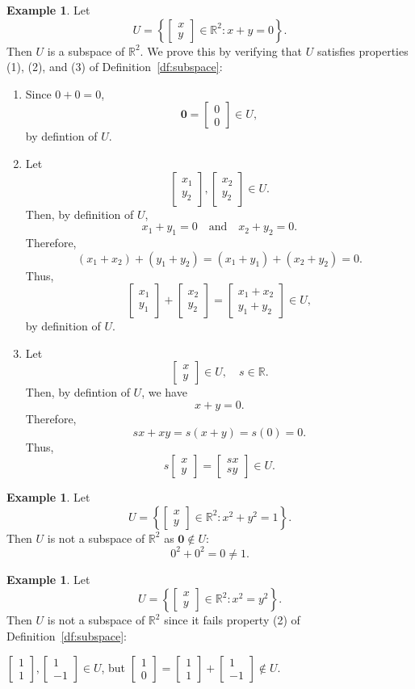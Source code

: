 \documentclass[12pt]{amsart}
\newcommand{\RR}{\mathbb{R}}
\theoremstyle{definition} \newtheorem{definition}[theorem]{Definition}
\newtheorem{example}[theorem]{Example}
\newcommand{\bzero}{\mathbf{0}}
\newcommand{\mat}[1]{\begin{bmatrix}#1\end{bmatrix}}
\begin{document}
\begin{example}\label{eg:nullspace_in_disguise}
  Let
  \[
    U = \left\{\mat{x\\y}\in\RR^2 : x+y=0\right\}.
  \]
  Then $U$ is a subspace of $\RR^2$. We prove this by verifying that $U$ satisfies properties (1), (2), and (3) of Definition~\ref{df:subspace}:
  \begin{enumerate}
    \item Since $0+0=0$,
    \[
      \bzero=\mat{0\\0}\in U,
    \]
    by defintion of $U$.

  \item Let
    \[
      \mat{x_1\\y_2},\mat{x_2\\y_2}\in U.
    \]
    Then, by definition of $U$,
    \[
      x_1+y_1=0\quad\text{and}\quad x_2+y_2=0.
    \]
    Therefore,
    \[
      (x_1+x_2) + (y_1+y_2) = (x_1+y_1) + (x_2+y_2)=0.
    \]
    Thus,
    \[
      \mat{x_1\\y_1} + \mat{x_2\\y_2} =
      \mat{x_1+x_2\\y_1+y_2}\in U,
    \]
    by definition of $U$.
    
  \item Let
    \[
      \mat{x\\y}\in U,\quad s\in \RR.
    \]
    Then, by defintion of $U$, we have 
    \[
      x+y=0.
    \]
    Therefore,
    \[
      sx+xy = s(x+y) =s(0) = 0.
    \]
    Thus,
    \[
      s\mat{x\\y} = \mat{sx\\sy}\in U.
    \]
 \end{enumerate}
\end{example}

\begin{example}
  Let
  \[
    U = \left\{\mat{x\\y}\in\RR^2 : x^2 + y^2 = 1\right\}.
  \]
  Then $U$ is not a subspace of $\RR^2$ as $\bzero\notin U$:
  \[
    0^2 + 0^2 = 0 \neq 1.
  \]
\end{example}

\begin{example}
  Let
  \[
    U = \left\{\mat{x\\y}\in\RR^2 : x^2 = y^2\right\}.
  \]
  Then $U$ is not a subspace of $\RR^2$ since it fails property (2) of Definition~\ref{df:subspace}:
  \begin{center}
    $\mat{1\\1}, \mat{1\\-1}\in U$,
    but $\mat{1\\0}=\mat{1\\1} + \mat{1\\-1}\notin U$.
  \end{center}
\end{example}
\end{document}
